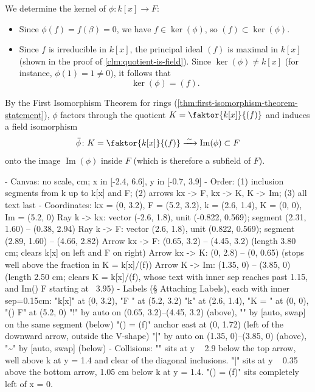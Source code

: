 \begin{content}
We determine the kernel of $\phi \colon k[x] \to F$:
\begin{itemize}
    \item Since $\phi(f) = f(\beta) = 0$, we have $f \in \ker(\phi)$, so $(f) \subset \ker(\phi)$.
    \item Since $f$ is irreducible in $k[x]$, the principal ideal $(f)$ is maximal in $k[x]$ (shown in the proof of \cref{clm:quotient-is-field}). Since $\ker(\phi) \neq k[x]$ (for instance, $\phi(1) = 1 \neq 0$), it follows that
    \[
    \ker(\phi) = (f).
    \]
\end{itemize}
By the First Isomorphism Theorem for rings (\cref{thm:first-isomorphism-theorem-statement}), $\phi$ factors through the quotient $K = \faktor{k[x]}{(f)}$ and induces a field isomorphism
\[
\bar{\phi} \colon K = \faktor{k[x]}{(f)} \xrightarrow{\;\sim\;} \operatorname{Im}(\phi) \subset F
\]
onto the image $\operatorname{Im}(\phi)$ inside $F$ (which is therefore a subfield of $F$).

\begin{hidden}
- Canvas: no scale, cm; x in [-2.4, 6.6], y in [-0.7, 3.9]
- Order: (1) inclusion segments from k up to k[x] and F; (2) arrows kx -> F, kx -> K, K -> Im; (3) all text last
- Coordinates:
  kx = (0, 3.2), F = (5.2, 3.2), k = (2.6, 1.4), K = (0, 0), Im = (5.2, 0)
  Ray k -> kx: vector (-2.6, 1.8), unit (-0.822, 0.569); segment (2.31, 1.60) -- (0.38, 2.94)
  Ray k -> F: vector (2.6, 1.8), unit (0.822, 0.569); segment (2.89, 1.60) -- (4.66, 2.82)
  Arrow kx -> F: (0.65, 3.2) -- (4.45, 3.2) (length 3.80 cm; clears k[x] on left and F \ni \beta on right)
  Arrow kx -> K: (0, 2.8) -- (0, 0.65) (stops well above the fraction in K = k[x]/(f))
  Arrow K -> Im: (1.35, 0) -- (3.85, 0) (length 2.50 cm; clears K = k[x]/(f), whose text with inner sep reaches past 1.15, and Im(\phi) \subset F starting at ~3.95)
- Labels (§ Attaching Labels), each with inner sep=0.15cm:
  "k[x]" at (0, 3.2), "F \ni \beta" at (5.2, 3.2)
  "k" at (2.6, 1.4), "K = " at (0, 0), "(\phi) \subset F" at (5.2, 0)
  "\exists!" by auto on (0.65, 3.2)--(4.45, 3.2) (above), "\phi" by [auto, swap] on the same segment (below)
  "\ker(\phi) = (f)" anchor east at (0, 1.72) (left of the downward arrow, outside the V-shape)
  "\bar{\phi}" by auto on (1.35, 0)--(3.85, 0) (above), "\sim" by [auto, swap] (below)
- Collisions: "\phi" sits at y ~ 2.9 below the top arrow, well above k at y = 1.4 and clear of the diagonal inclusions.
  "\bar{\phi}" sits at y ~ 0.35 above the bottom arrow, 1.05 cm below k at y = 1.4. "\ker(\phi) = (f)" sits completely left of x = 0.
\end{hidden}
\begin{center}
\end{center}
\end{content}
